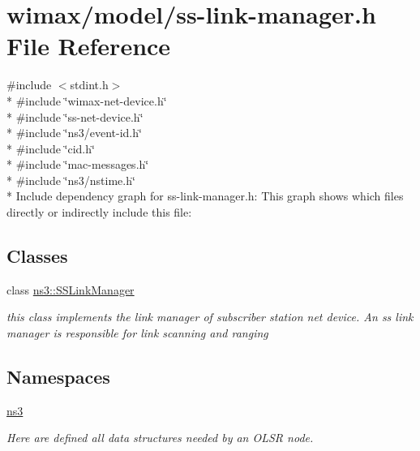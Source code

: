 \hypertarget{ss-link-manager_8h}{}\section{wimax/model/ss-\/link-\/manager.h File Reference}
\label{ss-link-manager_8h}
{\ttfamily \#include $<$stdint.\+h$>$}\\*
{\ttfamily \#include \char`\"{}wimax-\/net-\/device.\+h\char`\"{}}\\*
{\ttfamily \#include \char`\"{}ss-\/net-\/device.\+h\char`\"{}}\\*
{\ttfamily \#include \char`\"{}ns3/event-\/id.\+h\char`\"{}}\\*
{\ttfamily \#include \char`\"{}cid.\+h\char`\"{}}\\*
{\ttfamily \#include \char`\"{}mac-\/messages.\+h\char`\"{}}\\*
{\ttfamily \#include \char`\"{}ns3/nstime.\+h\char`\"{}}\\*
Include dependency graph for ss-\/link-\/manager.h\+:
This graph shows which files directly or indirectly include this file\+:
\subsection*{Classes}
\begin{DoxyCompactItemize}
\item 
class \hyperlink{classns3_1_1SSLinkManager}{ns3\+::\+S\+S\+Link\+Manager}
\begin{DoxyCompactList}\small\item\em this class implements the link manager of subscriber station net device. An ss link manager is responsible for link scanning and ranging \end{DoxyCompactList}\end{DoxyCompactItemize}
\subsection*{Namespaces}
\begin{DoxyCompactItemize}
\item 
 \hyperlink{namespacens3}{ns3}
\begin{DoxyCompactList}\small\item\em Here are defined all data structures needed by an O\+L\+SR node. \end{DoxyCompactList}\end{DoxyCompactItemize}
